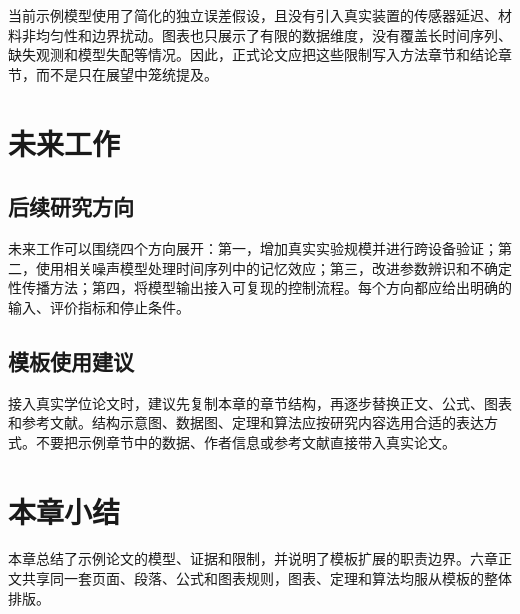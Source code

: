 当前示例模型使用了简化的独立误差假设，且没有引入真实装置的传感器延迟、材料非均匀性和边界扰动。图表也只展示了有限的数据维度，没有覆盖长时间序列、缺失观测和模型失配等情况。因此，正式论文应把这些限制写入方法章节和结论章节，而不是只在展望中笼统提及。

\section{未来工作}

\subsection{后续研究方向}

未来工作可以围绕四个方向展开：第一，增加真实实验规模并进行跨设备验证；第二，使用相关噪声模型处理时间序列中的记忆效应；第三，改进参数辨识和不确定性传播方法；第四，将模型输出接入可复现的控制流程。每个方向都应给出明确的输入、评价指标和停止条件。

\subsection{模板使用建议}

接入真实学位论文时，建议先复制本章的章节结构，再逐步替换正文、公式、图表和参考文献。结构示意图、数据图、定理和算法应按研究内容选用合适的表达方式。不要把示例章节中的数据、作者信息或参考文献直接带入真实论文。

\section{本章小结}

本章总结了示例论文的模型、证据和限制，并说明了模板扩展的职责边界。六章正文共享同一套页面、段落、公式和图表规则，图表、定理和算法均服从模板的整体排版。
